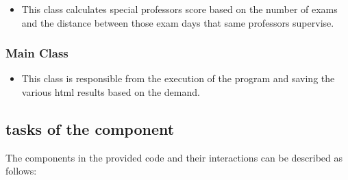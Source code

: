 \begin{itemize}
\item This class calculates special professors score based on the number of exams and the distance between those exam days that same professors supervise.

\end{itemize}

\subsubsection{Main Class}


\begin{itemize}
\item This class is responsible from the execution of the program and saving the various html results based on the demand.
\end{itemize}









\subsection{tasks of the component}
The components in the provided code and their interactions can be described as follows:

